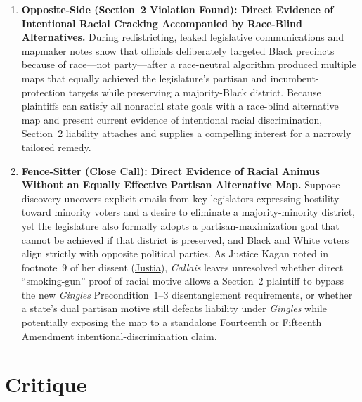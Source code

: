 \documentclass[12pt]{article}
\begin{document}
\begin{enumerate}
    \item \textbf{Opposite-Side (Section~2 Violation Found): Direct Evidence of Intentional Racial Cracking Accompanied by Race-Blind Alternatives.} During redistricting, leaked legislative communications and mapmaker notes show that officials deliberately targeted Black precincts because of race---not party---after a race-neutral algorithm produced multiple maps that equally achieved the legislature's partisan and incumbent-protection targets while preserving a majority-Black district. Because plaintiffs can satisfy all nonracial state goals with a race-blind alternative map and present current evidence of intentional racial discrimination, Section~2 liability attaches and supplies a compelling interest for a narrowly tailored remedy.

    \item \textbf{Fence-Sitter (Close Call): Direct Evidence of Racial Animus Without an Equally Effective Partisan Alternative Map.} Suppose discovery uncovers explicit emails from key legislators expressing hostility toward minority voters and a desire to eliminate a majority-minority district, yet the legislature also formally adopts a partisan-maximization goal that cannot be achieved if that district is preserved, and Black and White voters align strictly with opposite political parties. As Justice Kagan noted in footnote~9 of her dissent (\href{https://supreme.justia.com/cases/federal/us/608/24-109/}{Justia}), \textit{Callais} leaves unresolved whether direct ``smoking-gun'' proof of racial motive allows a Section~2 plaintiff to bypass the new \textit{Gingles} Precondition~1--3 disentanglement requirements, or whether a state's dual partisan motive still defeats liability under \textit{Gingles} while potentially exposing the map to a standalone Fourteenth or Fifteenth Amendment intentional-discrimination claim.
\end{enumerate}

\section{Critique}
\end{document}
